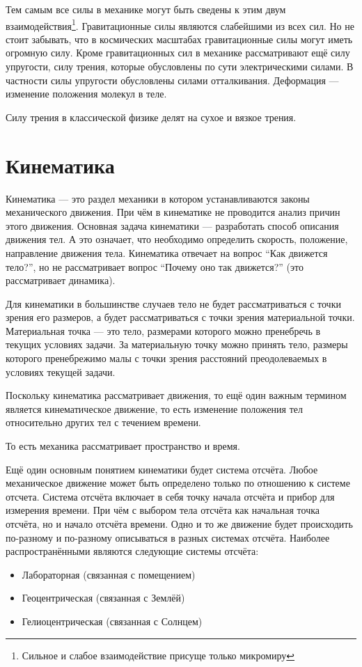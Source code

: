 \documentclass[10pt]{scrbook}
\begin{document}
Тем самым все силы в механике могут быть сведены к этим двум
взаимодействия\footnote{Сильное и слабое взаимодействие присуще только
	микромиру}. Гравитационные силы являются слабейшими из всех сил. Но не стоит
забывать, что в космических масштабах гравитационные силы могут иметь
огромную силу. Кроме гравитационных сил в механике рассматривают ещё силу
упругости, силу трения, которые обусловлены по сути электрическими силами. В
частности силы упругости обусловлены силами отталкивания. Деформация ---
изменение положения молекул в теле.

Силу трения в классической физике делят на сухое и вязкое трения.

\chapter{Кинематика}%

Кинематика --- это раздел механики в котором устанавливаются законы
механического движения. При чём в кинематике не проводится анализ причин этого
движения. Основная задача кинематики --- разработать способ описания движения
тел. А это означает, что необходимо определить скорость, положение, направление
движения тела. Кинематика отвечает на вопрос ``Как движется тело?'', но не
рассматривает вопрос ``Почему оно так движется?'' (это рассматривает динамика).

Для кинематики в большинстве случаев тело не будет рассматриваться с точки
зрения его размеров, а будет рассматриваться с точки зрения материальной точки.
Материальная точка --- это тело, размерами которого можно пренебречь в текущих
условиях задачи. За материальную точку можно принять тело, размеры которого
пренебрежимо малы с точки зрения расстояний преодолеваемых в условиях текущей
задачи.

Поскольку кинематика рассматривает движения, то ещё один важным термином
является кинематическое движение, то есть изменение положения тел относительно
других тел с течением времени.

То есть механика рассматривает пространство и время.

Ещё один основным понятием кинематики будет система отсчёта. Любое механическое
движение может быть определено только по отношению к системе отсчета. Система
отсчёта включает в себя точку начала отсчёта и прибор для измерения времени.
При чём с выбором тела отсчёта как начальная точка отсчёта, но и начало отсчёта
времени. Одно и то же движение будет происходить по-разному и по-разному
описываться в разных системах отсчёта. Наиболее распространёнными являются
следующие системы отсчёта:
\begin{itemize}
	\item Лабораторная (связанная с помещением)
	\item Геоцентрическая (связанная с Землёй)
	\item Гелиоцентрическая (связанная с Солнцем)
\end{itemize}
\end{document}
